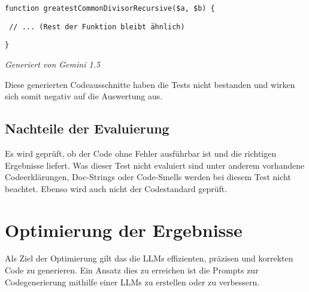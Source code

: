 \hrulefill

\texttt{function greatestCommonDivisorRecursive(\$a, \$b) \{}

\texttt{\hspace{0.6cm} // ... (Rest der Funktion bleibt ähnlich)}

\texttt{\}}

\hrulefill

\begin{flushright}
	\textit{Generiert von Gemini 1.5}
\end{flushright}

Diese generierten Codeausschnitte haben die Tests nicht bestanden und wirken sich somit negativ auf die Auswertung aus.

\subsection{Nachteile der Evaluierung}
Es wird geprüft, ob der Code ohne Fehler ausführbar ist und die richtigen Ergebnisse liefert. Was dieser Test nicht evaluiert sind unter anderem vorhandene Codeerklärungen, Doc-Strings oder Code-Smells werden bei diesem Test nicht beachtet. Ebenso wird auch nicht der Codestandard geprüft.\vspace{0.2cm}




\section{Optimierung der Ergebnisse}
Als Ziel der Optimierung gilt das die LLMs effizienten, präzisen und korrekten Code zu generieren. Ein Ansatz dies zu erreichen ist die Prompts zur Codegenerierung mithilfe einer LLMs zu erstellen oder zu verbessern.




